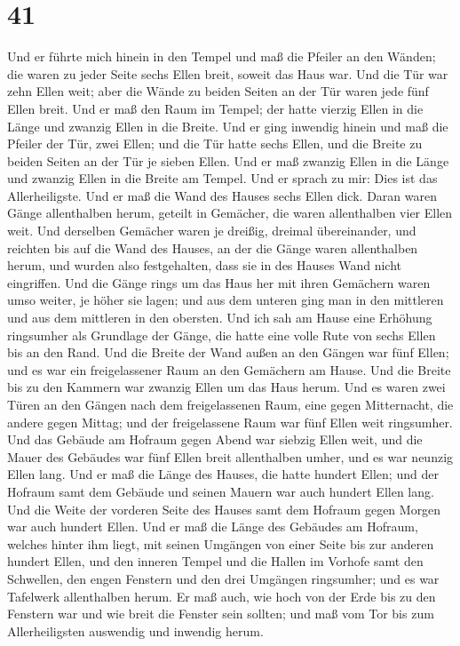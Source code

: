 \hypertarget{section-40}{%
\section{41}\label{section-40}}

 Und er führte mich hinein in den Tempel und maß die
Pfeiler an den Wänden; die waren zu jeder Seite sechs Ellen breit,
soweit das Haus war.  Und die Tür war zehn Ellen weit;
aber die Wände zu beiden Seiten an der Tür waren jede fünf Ellen breit.
Und er maß den Raum im Tempel; der hatte vierzig Ellen in die Länge und
zwanzig Ellen in die Breite.  Und er ging inwendig hinein
und maß die Pfeiler der Tür, zwei Ellen; und die Tür hatte sechs Ellen,
und die Breite zu beiden Seiten an der Tür je sieben Ellen.
 Und er maß zwanzig Ellen in die Länge und zwanzig Ellen
in die Breite am Tempel. Und er sprach zu mir: Dies ist das
Allerheiligste.  Und er maß die Wand des Hauses sechs
Ellen dick. Daran waren Gänge allenthalben herum, geteilt in Gemächer,
die waren allenthalben vier Ellen weit.  Und derselben
Gemächer waren je dreißig, dreimal übereinander, und reichten bis auf
die Wand des Hauses, an der die Gänge waren allenthalben herum, und
wurden also festgehalten, dass sie in des Hauses Wand nicht eingriffen.
 Und die Gänge rings um das Haus her mit ihren Gemächern
waren umso weiter, je höher sie lagen; und aus dem unteren ging man in
den mittleren und aus dem mittleren in den obersten.  Und
ich sah am Hause eine Erhöhung ringsumher als Grundlage der Gänge, die
hatte eine volle Rute von sechs Ellen bis an den Rand. 
Und die Breite der Wand außen an den Gängen war fünf Ellen; und es war
ein freigelassener Raum an den Gemächern am Hause.  Und
die Breite bis zu den Kammern war zwanzig Ellen um das Haus herum.
 Und es waren zwei Türen an den Gängen nach dem
freigelassenen Raum, eine gegen Mitternacht, die andere gegen Mittag;
und der freigelassene Raum war fünf Ellen weit ringsumher.
 Und das Gebäude am Hofraum gegen Abend war siebzig Ellen
weit, und die Mauer des Gebäudes war fünf Ellen breit allenthalben
umher, und es war neunzig Ellen lang.  Und er maß die
Länge des Hauses, die hatte hundert Ellen; und der Hofraum samt dem
Gebäude und seinen Mauern war auch hundert Ellen lang. 
Und die Weite der vorderen Seite des Hauses samt dem Hofraum gegen
Morgen war auch hundert Ellen.  Und er maß die Länge des
Gebäudes am Hofraum, welches hinter ihm liegt, mit seinen Umgängen von
einer Seite bis zur anderen hundert Ellen, und den inneren Tempel und
die Hallen im Vorhofe  samt den Schwellen, den engen
Fenstern und den drei Umgängen ringsumher; und es war Tafelwerk
allenthalben herum.  Er maß auch, wie hoch von der Erde
bis zu den Fenstern war und wie breit die Fenster sein sollten; und maß
vom Tor bis zum Allerheiligsten auswendig und inwendig herum.

